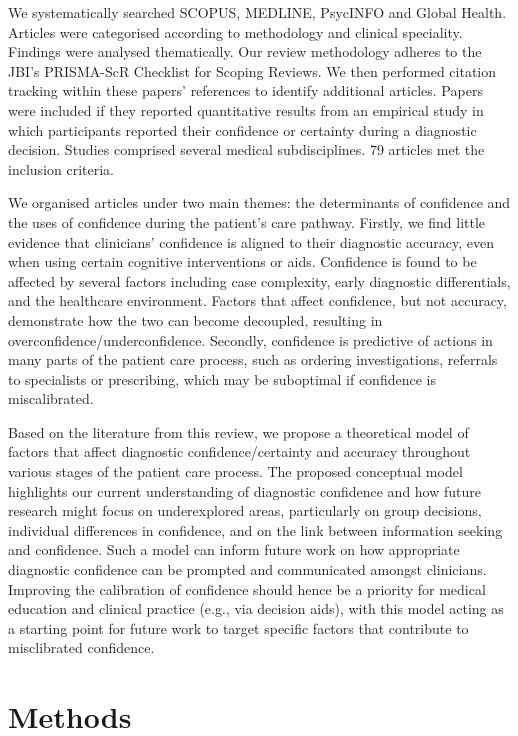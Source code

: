 \documentclass[a4paper, nobind]{templates/ociamthesis}
\begin{document}
\hfill\break
We systematically searched SCOPUS, MEDLINE, PsycINFO and Global Health. Articles were categorised according to methodology and clinical speciality. Findings were analysed thematically. Our review methodology adheres to the JBI's PRISMA-ScR Checklist for Scoping Reviews. We then performed citation tracking within these papers' references to identify additional articles. Papers were included if they reported quantitative results from an empirical study in which participants reported their confidence or certainty during a diagnostic decision. Studies comprised several medical subdisciplines. 79 articles met the inclusion criteria.

\hfill\break
We organised articles under two main themes: the determinants of confidence and the uses of confidence during the patient's care pathway. Firstly, we find little evidence that clinicians' confidence is aligned to their diagnostic accuracy, even when using certain cognitive interventions or aids. Confidence is found to be affected by several factors including case complexity, early diagnostic differentials, and the healthcare environment. Factors that affect confidence, but not accuracy, demonstrate how the two can become decoupled, resulting in overconfidence/underconfidence. Secondly, confidence is predictive of actions in many parts of the patient care process, such as ordering investigations, referrals to specialists or prescribing, which may be suboptimal if confidence is miscalibrated.

\hfill\break
Based on the literature from this review, we propose a theoretical model of factors that affect diagnostic confidence/certainty and accuracy throughout various stages of the patient care process. The proposed conceptual model highlights our current understanding of diagnostic confidence and how future research might focus on underexplored areas, particularly on group decisions, individual differences in confidence, and on the link between information seeking and confidence. Such a model can inform future work on how appropriate diagnostic confidence can be prompted and communicated amongst clinicians. Improving the calibration of confidence should hence be a priority for medical education and clinical practice (e.g., via decision aids), with this model acting as a starting point for future work to target specific factors that contribute to misclibrated confidence.

\section{Methods}\label{methods}
\end{document}

